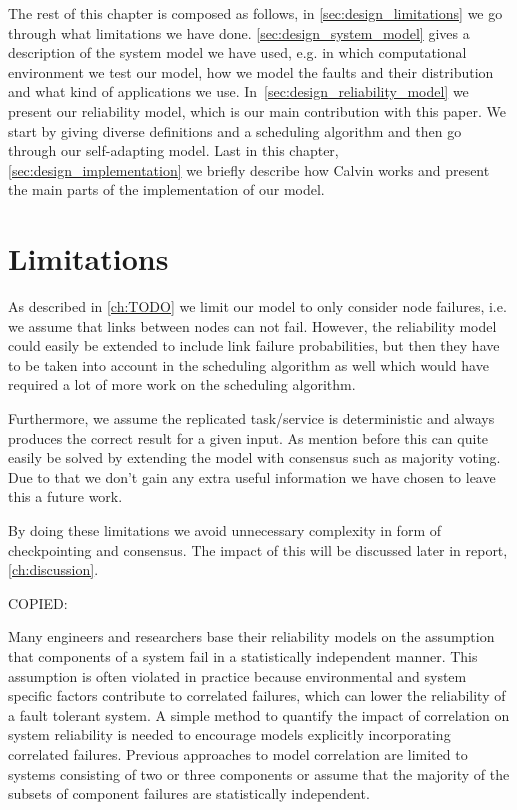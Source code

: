 \documentclass{cslthse-msc}
\begin{document}
The rest of this chapter is composed as follows, in \autoref{sec:design_limitations} we go through what limitations we have done. \autoref{sec:design_system_model} gives a description of the system model we have used, e.g. in which computational environment we test our model, how we model the faults and their distribution and what kind of applications we use. In~\autoref{sec:design_reliability_model} we present our reliability model, which is our main contribution with this paper. We start by giving diverse definitions and a scheduling algorithm and then go through our self-adapting model. Last in this chapter, \autoref{sec:design_implementation} we briefly describe how Calvin works and present the main parts of the implementation of our model.

\section{Limitations} \label{sec:design_limitations}
As described in \autoref{ch:TODO} we limit our model to only consider node failures, i.e. we assume that links between nodes can not fail. However, the reliability model could easily be extended to include link failure probabilities, but then they have to be taken into account in the scheduling algorithm as well which would have required a lot of more work on the scheduling algorithm.

Furthermore, we assume the replicated task/service is deterministic and always produces the correct result for a given input. As mention before this can quite easily be solved by extending the model with consensus such as majority voting. Due to that we don't gain any extra useful information we have chosen to leave this a future work.

By doing these limitations we avoid unnecessary complexity in form of checkpointing and consensus. The impact of this will be discussed later in report, \autoref{ch:discussion}.

\iffalse
COPIED:

Many engineers and researchers base their reliability models on the assumption that components of a system fail in a statistically independent manner. This assumption is often violated in practice because environmental and system specific factors contribute to correlated failures, which can lower the reliability of a fault tolerant system. A simple method to quantify the impact of correlation on system reliability is needed to encourage models explicitly incorporating correlated failures. Previous approaches to model correlation are limited to systems consisting of two or three components or assume that the majority of the subsets of component failures are statistically independent. \cite{discContRelModel}
\end{document}
